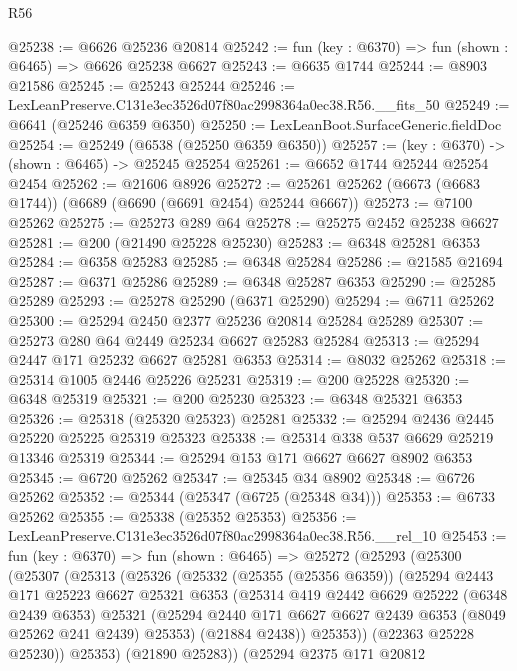 \begin{lexlean}{R56}
\begin{coremodule}
@25238 := @6626 @25236 @20814
@25242 := fun (key : @6370) => fun (shown : @6465) => @6626 @25238 @6627
@25243 := @6635 @1744
@25244 := @8903 @21586
@25245 := @25243 @25244
@25246 := LexLeanPreserve.C131e3ec3526d07f80ac2998364a0ec38.R56.__fits_50
@25249 := @6641 (@25246 @6359 @6350)
@25250 := LexLeanBoot.SurfaceGeneric.fieldDoc
@25254 := @25249 (@6538 (@25250 @6359 @6350))
@25257 := (key : @6370) -> (shown : @6465) -> @25245 @25254
@25261 := @6652 @1744 @25244 @25254 @2454
@25262 := @21606 @8926
@25272 := @25261 @25262 (@6673 (@6683 @1744)) (@6689 (@6690 (@6691 @2454) @25244 @6667))
@25273 := @7100 @25262
@25275 := @25273 @289 @64
@25278 := @25275 @2452 @25238 @6627
@25281 := @200 (@21490 @25228 @25230)
@25283 := @6348 @25281 @6353
@25284 := @6358 @25283
@25285 := @6348 @25284
@25286 := @21585 @21694
@25287 := @6371 @25286
@25289 := @6348 @25287 @6353
@25290 := @25285 @25289
@25293 := @25278 @25290 (@6371 @25290)
@25294 := @6711 @25262
@25300 := @25294 @2450 @2377 @25236 @20814 @25284 @25289
@25307 := @25273 @280 @64 @2449 @25234 @6627 @25283 @25284
@25313 := @25294 @2447 @171 @25232 @6627 @25281 @6353
@25314 := @8032 @25262
@25318 := @25314 @1005 @2446 @25226 @25231
@25319 := @200 @25228
@25320 := @6348 @25319
@25321 := @200 @25230
@25323 := @6348 @25321 @6353
@25326 := @25318 (@25320 @25323) @25281
@25332 := @25294 @2436 @2445 @25220 @25225 @25319 @25323
@25338 := @25314 @338 @537 @6629 @25219 @13346 @25319
@25344 := @25294 @153 @171 @6627 @6627 @8902 @6353
@25345 := @6720 @25262
@25347 := @25345 @34 @8902
@25348 := @6726 @25262
@25352 := @25344 (@25347 (@6725 (@25348 @34)))
@25353 := @6733 @25262
@25355 := @25338 (@25352 @25353)
@25356 := LexLeanPreserve.C131e3ec3526d07f80ac2998364a0ec38.R56.__rel_10
@25453 := fun (key : @6370) =>
  fun (shown : @6465) =>
  @25272
    (@25293
      (@25300
        (@25307
          (@25313
            (@25326
              (@25332
                (@25355 (@25356 @6359))
                (@25294
                  @2443
                  @171
                  @25223
                  @6627
                  @25321
                  @6353
                  (@25314
                    @419
                    @2442
                    @6629
                    @25222
                    (@6348 @2439 @6353)
                    @25321
                    (@25294 @2440 @171 @6627 @6627 @2439 @6353 (@8049 @25262 @241 @2439) @25353)
                    (@21884 @2438))
                  @25353))
              (@22363 @25228 @25230))
            @25353)
          (@21890 @25283))
        (@25294
          @2375
          @171
          @20812

\end{coremodule}
\end{lexlean}
